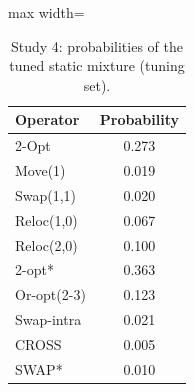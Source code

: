 \begin{table}[t]
\caption{Study 4: probabilities of the tuned static mixture (tuning set).}\label{tab:s4pesos}
\centering
\small
\begin{adjustbox}{max width=\linewidth}
\begin{tabular}{lc}
\toprule
Operator & Probability \\
\midrule
2-Opt & 0.273 \\
Move(1) & 0.019 \\
Swap(1,1) & 0.020 \\
Reloc(1,0) & 0.067 \\
Reloc(2,0) & 0.100 \\
2-opt* & 0.363 \\
Or-opt(2-3) & 0.123 \\
Swap-intra & 0.021 \\
CROSS & 0.005 \\
SWAP* & 0.010 \\
\bottomrule
\end{tabular}
\end{adjustbox}
\end{table}
